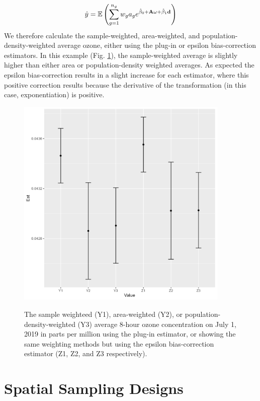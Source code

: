 \begin{equation}
    \hat{y} = \operatorname{\mathbb{E}}\left(\sum_{g=1}^{n_g} w_g a_g e^{\hat\beta_0 + \mathbf{A \omega} + \hat\beta_1 \mathbf{d}} \right)
\end{equation}
We therefore calculate the sample-weighted, area-weighted, and population-density-weighted average ozone, either using the plug-in or epsilon bias-correction estimators.  In this example (Fig. \ref{fig:Chap6_totals}), the sample-weighted average is slightly higher than either area or population-density weighted averages.  As expected the epsilon bias-correction results in a slight increase for each estimator, where this positive correction results because the derivative of the transformation (in this case, exponentiation) is positive.    

\begin{figure}[!ht]
    \caption[Alternative weighting for average ozone concentration]{The sample weighteed (Y1), area-weighted (Y2), or population-density-weighted (Y3) average 8-hour ozone concentration on July 1, 2019 in parts per million using the plug-in estimator, or showing the same weighting methods but using the epsilon bias-correction estimator (Z1, Z2, and Z3 respectively).}
    \centering
    \includegraphics[width=4in]{Chap_6/Totals.png}
    \label{fig:Chap6_totals}
\end{figure}

\section{Spatial Sampling Designs}

